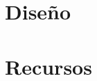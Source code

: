 \documentclass[12pt,letterpaper]{report}
\begin{document}
\chapter{Diseño}
\label{ch:Impl}    


\chapter{Recursos}
\label{ch:rec}



%
    
%

%

%
%
%



\end{document}
